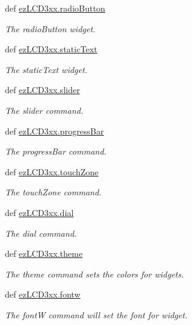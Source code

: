 \begin{DoxyCompactItemize}
def \hyperlink{group___widgets_gaeb3dc4a2ae0923d39259c6583b4ed240}{ez\-L\-C\-D3xx.\-radio\-Button}
\begin{DoxyCompactList}\small\item\em The radio\-Button widget. \end{DoxyCompactList}\item 
def \hyperlink{group___widgets_ga1f298ec66c48404b6c9deb6bebb0815c}{ez\-L\-C\-D3xx.\-static\-Text}
\begin{DoxyCompactList}\small\item\em The static\-Text widget. \end{DoxyCompactList}\item 
def \hyperlink{group___widgets_gafce5d2b8d149e7d84a27ca9740baefe3}{ez\-L\-C\-D3xx.\-slider}
\begin{DoxyCompactList}\small\item\em The slider command. \end{DoxyCompactList}\item 
def \hyperlink{group___widgets_ga1e17ba92ebcd90504fdc0f8fddb84bf0}{ez\-L\-C\-D3xx.\-progress\-Bar}
\begin{DoxyCompactList}\small\item\em The progress\-Bar command. \end{DoxyCompactList}\item 
def \hyperlink{group___widgets_ga7a2150ae399ca581088ac55f421731cb}{ez\-L\-C\-D3xx.\-touch\-Zone}
\begin{DoxyCompactList}\small\item\em The touch\-Zone command. \end{DoxyCompactList}\item 
def \hyperlink{group___widgets_ga8691bfb0f80929f4b4e09a83697532b8}{ez\-L\-C\-D3xx.\-dial}
\begin{DoxyCompactList}\small\item\em The dial command. \end{DoxyCompactList}\item 
def \hyperlink{group___widgets_gacdc1a0697e6d5777b4d77bfc5247f0bf}{ez\-L\-C\-D3xx.\-theme}
\begin{DoxyCompactList}\small\item\em The theme command sets the colors for widgets. \end{DoxyCompactList}\item 
def \hyperlink{group___widgets_gad527fa9cb9cda35802e26af7e1870f96}{ez\-L\-C\-D3xx.\-fontw}
\begin{DoxyCompactList}\small\item\em The font\-W command will set the font for widget. \end{DoxyCompactList}\item 

\end{DoxyCompactItemize}

